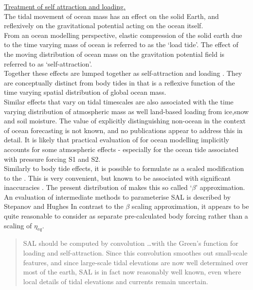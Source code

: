 \underline{Treatment of self attraction and loading.} \\
The tidal movement of ocean mass has an effect on the solid Earth, and reflexively on the gravitational potential acting on the ocean itself.\\
From an ocean modelling perspective, elastic compression of the solid earth due to the time varying mass of ocean is referred to as the `load tide'.  The effect of the moving distribution of ocean mass on the gravitation potential field is referred to as `self-attraction'.\\
Together these effects are lumped together as self-attraction and loading \SAL{}.  They are conceptually distinct from body tides in that \SAL{} is a reflexive function of the time varying spatial distribution of global ocean mass.\\
Similar effects that vary on tidal timescales are also associated with the time varying distribution of atmospheric mass as well land-based loading from ice,snow and soil moisture.  The value of explicitly distinguishing non-ocean \SAL{} in the context of ocean forecasting is not known, and no publications appear to address this in detail.  It is likely that practical evaluation of \SAL{} for ocean modelling implicitly accounts for some atmospheric effects - especially for the ocean tide associated with pressure forcing S1 and S2.\\



Similarly to body tide effects, it is possible to formulate \SAL{} as a scaled modification to the \ATGF{}.  This is very convenient, but known to be associated with significant inaccuracies \citep{Ray:1998jl}.  The present distribution of \MOM{} makes this so called `$\beta$' approximation.\\
An evaluation of intermediate methods to parameterise SAL is described by Stepanov and Hughes \cite{Stepanov:2004up}
In contrast to the $\beta$ scaling approximation, it appears to be quite reasonable to consider \SAL{} as separate pre-calculated body forcing rather than a scaling of $\eta_{eq}$. 
\begin{quotation}
SAL should be computed by convolution \dots with the Green's function for loading and self-attraction. Since this convolution smoothes out small-scale features, and since large-scale tidal elevations are now well determined over most	of the earth, SAL is in fact now reasonably well known, even where local details of tidal elevations and currents remain uncertain. \citep{Egbert:2002ug}
\end{quotation}




